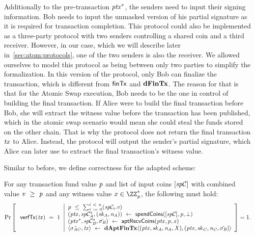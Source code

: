 \begin{definition}
\begin{itemize}
        Additionally to the pre-transaction $\mathit{ptx}^*$, the senders need to input their signing information.
        Bob needs to input the unmasked version of his partial signature as it is required for transaction completion.
        This protocol could also be implemented as a three-party protocol with two senders controlling a shared coin and a third receiver.
        However, in our case, which we will describe later in~\cref{sec:atom:protocols}, one of the two senders is also the receiver.
        We allowed ourselves to model this protocol as being between only two parties to simplify the formalization.
        In this version of the protocol, only Bob can finalize the transaction, which is different from $\mathsf{finTx}$ and $\mathbf{dFinTx}$.
        The reason for that is that for the Atomic Swap execution, Bob needs to be the one in control of building the final transaction.
        If Alice were to build the final transaction before Bob, she will extract the witness value before the transaction has been published, which in the atomic swap scenario would mean she could steal the funds stored on the other chain.
        That is why the protocol does not return the final transaction $\mathit{tx}$ to Alice.
        Instead, the protocol will output the sender's partial signature, which Alice can later use to extract the final transaction's witness value.
    \end{itemize}
\end{definition}

Similar to before, we define correctness for the adapted scheme:

\begin{definition}
    \label{def:atom:apt-tx-scheme-correctness}
    For any transaction fund value $\mathit{p}$ and list of input coins $[\mathit{sp}\mathcal{C}]$ with combined value $\mathit{v} ~\geq~ \mathit{p}$ and any witness value $\varX \opIn \cnstIntegersPrimeWithoutZero{\varPrime}$, the following must hold:
    \[
        \Pr\left[
        \begin{array}{c}
            \: \mathsf{verfTx}(\mathit{tx}) ~=~ 1
        \end{array}
        \middle\vert
        \begin{array}{l}
            \mathit{p} ~\leq~ \sum_{\mathit{i} ~:=~ 0}^{\mathit{i} ~<~ \mathit{n}}(\mathit{sp}\mathcal{C}_{i}.\mathit{v}) \\
            (\mathit{ptx}, \mathit{sp}\mathcal{C}_{\mathit{A}}^*, (\mathit{sk}_{\mathit{A}}, \mathit{\mathit{n}_{\mathit{A}}})) ~\leftarrow~ \mathsf{spendCoins}([\mathit{sp}\mathcal{C}],\mathit{p},\bot) \\
            (\mathit{ptx}^*, \mathit{sp}\mathcal{C}_{\mathit{B}}^*, \tilde{\sigma_{\mathit{B}}}) ~\leftarrow~ \mathsf{aptRecvCoins}(\mathit{ptx},\mathit{p},\mathit{x}) \\
            \langle \tilde{\sigma_{\mathit{A}\mathit{C}}}, \mathit{tx} \rangle ~\leftarrow~ \mathbf{dAptFinTx} \langle (\mathit{ptx},\mathit{sk}_{\mathit{A}},\mathit{\mathit{n}_{\mathit{A}}},\mathit{X}), (\mathit{ptx},\mathit{sk}_{\mathit{C}},\mathit{\mathit{n}_{\mathit{C}}},\tilde{\sigma_{\mathit{B}}}) \rangle
        \end{array}
        \right]=1.
    \]
\end{definition}
